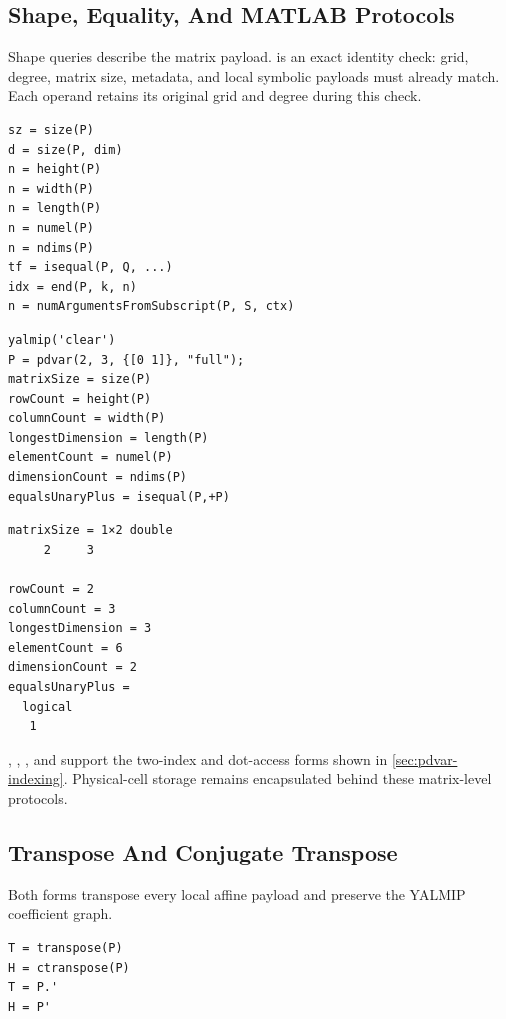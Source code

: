 \subsection{Shape, Equality, And MATLAB Protocols}
\label{sec:pdvar-matrix-shape}
\label{sec:pdvar-matrix-protocol}

Shape queries describe the matrix payload.  is an exact identity check: grid, degree, matrix size, metadata, and local symbolic payloads must already match. Each operand retains its original grid and degree during this check.

\syntaxhead
\begin{lstlisting}[style=dpsyntax]
sz = size(P)
d = size(P, dim)
n = height(P)
n = width(P)
n = length(P)
n = numel(P)
n = ndims(P)
tf = isequal(P, Q, ...)
idx = end(P, k, n)
n = numArgumentsFromSubscript(P, S, ctx)
\end{lstlisting}

\examplehead
\begin{lstlisting}[style=dpmatlab]
yalmip('clear')
P = pdvar(2, 3, {[0 1]}, "full");
matrixSize = size(P)
rowCount = height(P)
columnCount = width(P)
longestDimension = length(P)
elementCount = numel(P)
dimensionCount = ndims(P)
equalsUnaryPlus = isequal(P,+P)
\end{lstlisting}

\begin{lstlisting}[style=dpoutput]
matrixSize = 1×2 double
     2     3

rowCount = 2
columnCount = 3
longestDimension = 3
elementCount = 6
dimensionCount = 2
equalsUnaryPlus =
  logical
   1
\end{lstlisting}

, , , and  support the two-index and dot-access forms shown in \cref{sec:pdvar-indexing}. Physical-cell storage remains encapsulated behind these matrix-level protocols.

\subsection{Transpose And Conjugate Transpose}
\label{sec:pdvar-matrix-transform}

Both forms transpose every local affine payload and preserve the YALMIP coefficient graph.

\syntaxhead
\begin{lstlisting}[style=dpsyntax]
T = transpose(P)
H = ctranspose(P)
T = P.'
H = P'
\end{lstlisting}

